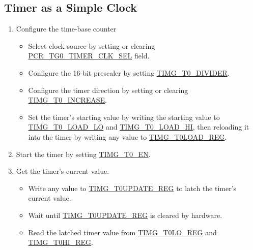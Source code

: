 \documentclass[main\_\_EN.tex]{subfiles}
\begin{document}
\subsection{Timer as a Simple Clock}\label{sec:timg-func-descr-simple-clock}
\begin{enumerate}
    \item Configure the time-base counter
    \begin{itemize}
        \item Select clock source by setting or clearing \hyperref[fielddesc:PCRTG0TIMERCLKSEL]{PCR\_TG0\_TIMER\_CLK\_SEL} field.
        \item Configure the 16-bit prescaler by setting \hyperref[fielddesc:TIMGTXDIVIDER]{TIMG\_T0\_DIVIDER}.
        \item Configure the timer direction by setting or clearing \hyperref[fielddesc:TIMGTXINCREASE]{TIMG\_T0\_INCREASE}.
        \item Set the timer's starting value by writing the starting value to \hyperref[fielddesc:TIMGTXLOADLO]{TIMG\_T0\_LOAD\_LO} and \hyperref[fielddesc:TIMGTXLOADHI]{TIMG\_T0\_LOAD\_HI}, then reloading it into the timer by writing any value to \hyperref[regdesc:TIMGTXLOADREG]{TIMG\_T0LOAD\_REG}.
    \end{itemize}
    \item Start the timer by setting \hyperref[fielddesc:TIMGTXEN]{TIMG\_T0\_EN}.
    \item Get the timer's current value.
    \begin{itemize}
        \item  Write any value to \hyperref[regdesc:TIMGTXUPDATEREG]{TIMG\_T0UPDATE\_REG} to latch the timer's current value.
        \item Wait until \hyperref[regdesc:TIMGTXUPDATEREG]{TIMG\_T0UPDATE\_REG} is cleared by hardware.
        \item  Read the latched timer value from \hyperref[regdesc:TIMGTXLOREG]{TIMG\_T0LO\_REG} and \hyperref[regdesc:TIMGTXHIREG]{TIMG\_T0HI\_REG}.   
    \end{itemize}   
\end{enumerate}
\end{document}

